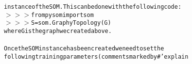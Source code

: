 {{\begin{tabbing}
{\texttt{instance\hspace{6pt}of\hspace{6pt}the\hspace{6pt}SOM.\hspace{12pt}This\hspace{6pt}can\hspace{6pt}be\hspace{6pt}done\hspace{6pt}with\hspace{6pt}the\hspace{6pt}following\hspace{6pt}code:}}\\
{\texttt{$>$$>$$>$\hspace{6pt}from\hspace{6pt}pysom\hspace{6pt}import\hspace{6pt}som}}\\
{\texttt{$>$$>$$>$\hspace{6pt}S\hspace{6pt}=\hspace{6pt}som.GraphyTopology(G)}}\\
{\texttt{where\hspace{6pt}G\hspace{6pt}is\hspace{6pt}the\hspace{6pt}graph\hspace{6pt}we\hspace{6pt}created\hspace{6pt}above.}}\\
\\
{\texttt{Once\hspace{6pt}the\hspace{6pt}SOM\hspace{6pt}instance\hspace{6pt}has\hspace{6pt}been\hspace{6pt}created\hspace{6pt}we\hspace{6pt}need\hspace{6pt}to\hspace{6pt}set\hspace{6pt}the}}\\
{\texttt{following\hspace{6pt}training\hspace{6pt}parameters\hspace{6pt}(comments\hspace{6pt}marked\hspace{6pt}by\hspace{6pt}{'}\#{'}\hspace{6pt}explain}}\\

\end{tabbing}}}
